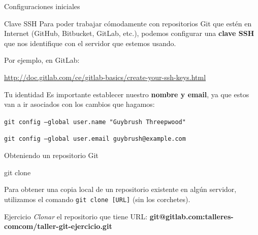 \begin{frame}[fragile]{Configuraciones iniciales}

	\begin{block}{Clave SSH}
		Para poder trabajar cómodamente con repositorios Git que estén en Internet (GitHub, Bitbucket, GitLab, etc.), podemos configurar una \textbf{clave SSH} que nos identifique con el servidor que estemos usando.

        Por ejemplo, en GitLab:

        \url{http://doc.gitlab.com/ce/gitlab-basics/create-your-ssh-keys.html}
	\end{block}

    \begin{block}{Tu identidad}
        Es importante establecer nuestro \textbf{nombre y email}, ya que estos van a ir asociados con los cambios que hagamos:

        \vspace{0.5em}

        \texttt{git config --global user.name "Guybrush Threepwood"}

        \texttt{git config --global user.email guybrush@example.com}
    \end{block}


\end{frame}

\begin{frame}[t]{Obteniendo un repositorio Git}

    \begin{comando}
        git clone
    \end{comando}

    \pause
	\begin{block}{}
        Para obtener una copia local de un repositorio existente en algún servidor,
        utilizamos el comando \texttt{git clone [URL]} (sin los corchetes).
    \end{block}

    \pause
    \vspace{1em}
    \begin{ejercicio}{Ejercicio}
        \textit{Clonar} el repositorio que tiene URL: \textbf{git@gitlab.com:talleres-comcom/taller-git-ejercicio.git}
    \end{ejercicio}
\end{frame}

